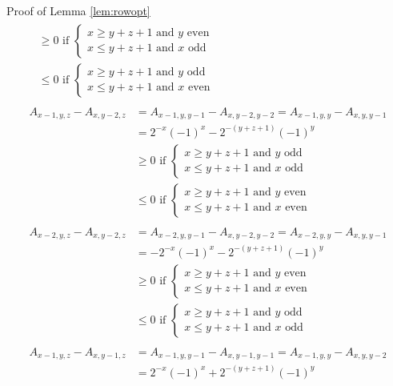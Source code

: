 \begin{proof2}{Proof of Lemma \ref{lem:rowopt}}
\begin{align*}
\begin{split}
&\ge0\text{ if }
\left\{
\begin{array}{l}
x\ge y+z+1\text{ and $y$ even}\\
x\le y+z+1\text{ and $x$ odd}
\end{array}\right.\\
&\le0\text{ if }
\left\{
\begin{array}{l}
x\ge y+z+1\text{ and $y$ odd}\\
x\le y+z+1\text{ and $x$ even}
\end{array}\right.
\end{split}\\
\begin{split}
A_{x-1,y,z}-A_{x,y-2,z}&=A_{x-1,y,y-1}-A_{x,y-2,y-2}=A_{x-1,y,y}-A_{x,y,y-1}\\
&=2^{-x}(-1)^x-2^{-(y+z+1)}(-1)^y\\
&\ge0\text{ if }
\left\{
\begin{array}{l}
x\ge y+z+1\text{ and $y$ odd}\\
x\le y+z+1\text{ and $x$ odd}
\end{array}\right.\\
&\le0\text{ if }
\left\{
\begin{array}{l}
x\ge y+z+1\text{ and $y$ even}\\
x\le y+z+1\text{ and $x$ even}
\end{array}\right.
\end{split}\\
\begin{split}
A_{x-2,y,z}-A_{x,y-2,z}&=A_{x-2,y,y-1}-A_{x,y-2,y-2}=A_{x-2,y,y}-A_{x,y,y-1}\\
&=-2^{-x}(-1)^x-2^{-(y+z+1)}(-1)^y\\
&\ge0\text{ if }
\left\{
\begin{array}{l}
x\ge y+z+1\text{ and $y$ even}\\
x\le y+z+1\text{ and $x$ even}
\end{array}\right.\\
&\le0\text{ if }
\left\{
\begin{array}{l}
x\ge y+z+1\text{ and $y$ odd}\\
x\le y+z+1\text{ and $x$ odd}
\end{array}\right.
\end{split}\\
\begin{split}
A_{x-1,y,z}-A_{x,y-1,z}&=A_{x-1,y,y-1}-A_{x,y-1,y-1}=A_{x-1,y,y}-A_{x,y,y-2}\\
&=2^{-x}(-1)^x+2^{-(y+z+1)}(-1)^y\\

\end{split}
\end{align*}
\end{proof2}
